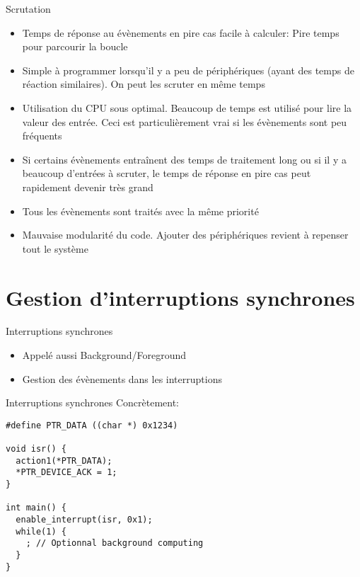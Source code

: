 \begin{frame}{Scrutation}
  \begin{itemize}
  \item Temps de réponse au  évènements en pire cas facile à calculer:
    Pire temps pour parcourir la boucle
  \item Simple à programmer lorsqu'il  y a peu de périphériques (ayant
    des temps  de réaction  similaires). On peut  les scruter  en même
    temps
  \item Utilisation du CPU sous optimal. Beaucoup de temps est utilisé
    pour lire la valeur des  entrée. Ceci est particulièrement vrai si
    les évènements sont peu fréquents
  \item Si certains évènements entraînent des temps de traitement long
    ou si il y a beaucoup  d'entrées à scruter, le temps de réponse en
    pire cas peut rapidement devenir très grand
  \item Tous les évènements sont traités avec la même priorité
  \item  Mauvaise modularité  du code.  Ajouter des périphériques
    revient à repenser tout le système
  \end{itemize}
\end{frame}

\section{Gestion d'interruptions synchrones}

\begin{frame}{Interruptions synchrones}
  \begin{itemize}
  \item Appelé aussi Background/Foreground
  \item Gestion des évènements dans les interruptions
  \end{itemize}
  \begin{center}
  \end{center}
\end{frame}

\begin{frame}[fragile]{Interruptions synchrones}
  Concrètement:
  \begin{lstlisting}
#define PTR_DATA ((char *) 0x1234)

void isr() {
  action1(*PTR_DATA);
  *PTR_DEVICE_ACK = 1;
}

int main() {
  enable_interrupt(isr, 0x1);
  while(1) {
    ; // Optionnal background computing
  }
}
  \end{lstlisting}
\end{frame}

